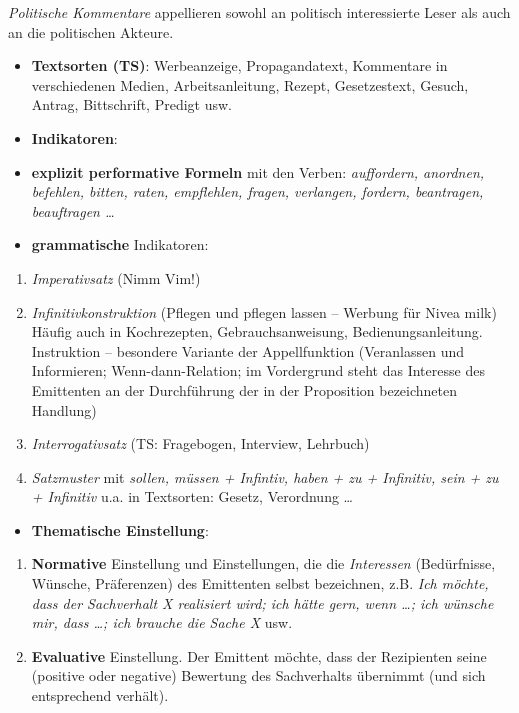 \documentclass[
  letterpaper,
]{scrbook}
\providecommand{\tightlist}{%
  \setlength{\itemsep}{0pt}\setlength{\parskip}{0pt}}\usepackage{longtable,booktabs,array}
\begin{document}
\emph{Politische Kommentare} appellieren sowohl an politisch
interessierte Leser als auch an die politischen Akteure.

\begin{itemize}
\item
  \textbf{Textsorten (TS)}: Werbeanzeige, Propagandatext, Kommentare in
  verschiedenen Medien, Arbeitsanleitung, Rezept, Gesetzestext, Gesuch,
  Antrag, Bittschrift, Predigt usw.
\item
  \textbf{Indikatoren}:\\
\item
  \textbf{explizit performative Formeln} mit den Verben:
  \emph{auffordern, anordnen, befehlen, bitten, raten, empflehlen,
  fragen, verlangen, fordern, beantragen, beauftragen \ldots{}}\\
\item
  \textbf{grammatische} Indikatoren:
\end{itemize}

\begin{enumerate}
\def\labelenumi{\alph{enumi})}
\tightlist
\item
  \emph{Imperativsatz} (Nimm Vim!)
\item
  \emph{Infinitivkonstruktion} (Pflegen und pflegen lassen -- Werbung
  für Nivea milk)\\
  Häufig auch in Kochrezepten, Gebrauchsanweisung,
  Bedienungsanleitung.\\
  Instruktion -- besondere Variante der Appellfunktion (Veranlassen und
  Informieren; Wenn-dann-Relation; im Vordergrund steht das Interesse
  des Emittenten an der Durchführung der in der Proposition bezeichneten
  Handlung)
\item
  \emph{Interrogativsatz} (TS: Fragebogen, Interview, Lehrbuch)\\
\item
  \emph{Satzmuster} mit \emph{sollen, müssen + Infintiv, haben + zu +
  Infinitiv, sein + zu + Infinitiv} u.a. in Textsorten: Gesetz,
  Verordnung \ldots{}
\end{enumerate}

\begin{itemize}
\tightlist
\item
  \textbf{Thematische Einstellung}:\\
\end{itemize}

\begin{enumerate}
\def\labelenumi{\alph{enumi})}
\tightlist
\item
  \textbf{Normative} Einstellung und Einstellungen, die die
  \emph{Interessen} (Bedürfnisse, Wünsche, Präferenzen) des Emittenten
  selbst bezeichnen, z.B. \emph{Ich möchte, dass der Sachverhalt X
  realisiert wird; ich hätte gern, wenn \ldots; ich wünsche mir, dass
  \ldots; ich brauche die Sache X} usw.\\
\item
  \textbf{Evaluative} Einstellung. Der Emittent möchte, dass der
  Rezipienten seine (positive oder negative) Bewertung des Sachverhalts
  übernimmt (und sich entsprechend verhält).
\end{enumerate}
\end{document}
